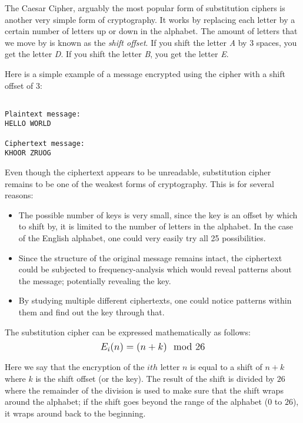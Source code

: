 The Caesar Cipher, arguably the most popular form of substitution ciphers is another very simple form of cryptography. 
It works by replacing each letter by a certain number of letters up or down in the alphabet. The amount of 
letters that we move by is known as the \textit{shift offset}. If you shift the letter \textit{A} by 3 spaces, you get 
the letter \textit{D}. If you shift the letter \textit{B}, you get the letter \textit{E}.

Here is a simple example of a message encrypted using the cipher with a shift offset of 3:

\begin{verbatim}

Plaintext message: 
HELLO WORLD
               
Ciphertext message:
KHOOR ZRUOG
\end{verbatim}

Even though the ciphertext appears to be unreadable, substitution cipher remains to be one of the weakest forms of cryptography. 
This is for several reasons:
\begin{itemize}  
    \item The possible number of keys is very small, since the key is an offset by which to shift by, it is limited to the number of letters in the alphabet.
    In the case of the English alphabet, one could very easily try all 25 possibilities. 
    \item Since the structure of the original message remains intact, the ciphertext could be subjected to frequency-analysis which would reveal patterns about the message;
    potentially revealing the key.
    \item By studying multiple different ciphertexts, one could notice patterns within them and find out the key through that.
\end{itemize}

The substitution cipher can be expressed mathematically as follows: $$\mathlarger{E_i(n)=(n+k)\mod{26}}$$

Here we say that the encryption of the $ith$ letter $n$ is equal to a shift of $n+k$ where $k$ is the shift offset (or the key). The result of the shift
is divided by $26$ where the remainder of the division is used to make sure that the shift wraps around the alphabet; if the 
shift goes beyond the range of the alphabet ($0$ to $26$), it wraps around back to the beginning.

